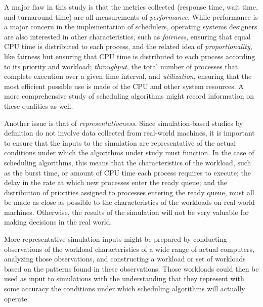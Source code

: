 \documentclass[12pt,letterpaper]{article}
\begin{document}
  			A major flaw in this study is that the metrics collected (response time, wait time, and turnaround time) are all measurements of \textit{performance}. While performance is a major concern in the implementation of schedulers, operating systems designers are also interested in other characteristics, such as \textit{fairness}, ensuring that equal CPU time is distributed to each process, and the related idea of \textit{proportionality}, like fairness but ensuring that CPU time is distributed to each process according to its priority and workload; \textit{throughput}, the total number of processes that complete execution over a given time interval, and \textit{utilization}, ensuring that the most efficient possible use is made of the CPU and other system resources. A more comprehensive study of scheduling algorithms might record information on these qualities as well.

  			Another issue is that of \textit{representativeness}. Since  simulation-based studies by definition do not involve data collected from real-world machines, it is important to ensure that the inputs to the simulation are representative of the actual conditions under which the algorithms under study must function. In the case of scheduling algorithms, this means that the characteristics of the workload, such as the burst time, or amount of CPU time each process requires to execute; the delay in the rate at which new processes enter the ready queue; and the distribution of priorities assigned to processes entering the ready queue, must all be made as close as possible to the characteristics of the workloads on real-world machines. Otherwise, the results of the simulation will not be very valuable for making decisions in the real world.

  			More representative simulation inputs might be prepared by conducting observations of the workload characteristics of a wide range of actual computers, analyzing those observations, and constructing a workload or set of workloads based on the patterns found in these observations. Those workloads could then be used as input to simulations with the understanding that they represent with some accuracy the conditions under which scheduling algorithms will actually operate.
\end{document}
